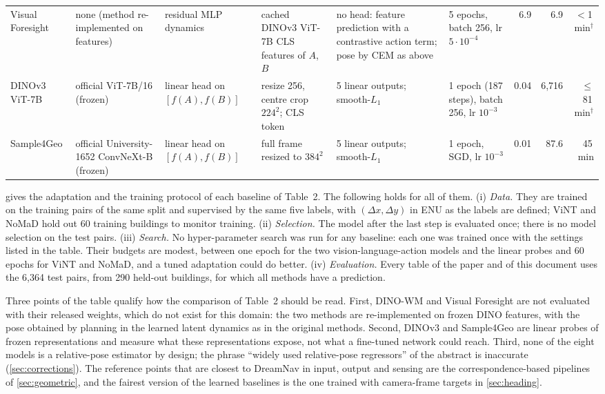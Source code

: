 \documentclass[10pt,twocolumn,letterpaper]{article}
\begin{document}
\begin{table}[t]
{\begin{tabular}{@{}l L{2.3cm} L{2.75cm} L{2.75cm} L{3.3cm} L{2.2cm} r r r@{}}
Visual Foresight & none (method re-implemented on features) & residual MLP dynamics & cached DINOv3 ViT-7B CLS features of $A$, $B$ & no head: feature prediction with a contrastive action term; pose by CEM as above & 5 epochs, batch 256, lr $5{\cdot}10^{-4}$ & 6.9 & 6.9 & $<$1\,min$^\dagger$ \\
DINOv3 ViT-7B & official ViT-7B/16 (frozen) & linear head on $[f(A),f(B)]$ & resize 256, centre crop $224^2$; CLS token & 5 linear outputs; smooth-$L_1$ & 1 epoch (187 steps), batch 256, lr $10^{-3}$ & 0.04 & 6{,}716 & $\le$81\,min$^\dagger$ \\
Sample4Geo & official University-1652 ConvNeXt-B (frozen) & linear head on $[f(A),f(B)]$ & full frame resized to $384^2$ & 5 linear outputs; smooth-$L_1$ & 1 epoch, SGD, lr $10^{-3}$ & 0.01 & 87.6 & 45\,min \\
\bottomrule
\end{tabular}}
\end{table}

 gives the adaptation and the training protocol of each baseline of Table~2. The following holds for all of them. (i) \emph{Data.} They are trained on the training pairs of the same split and supervised by the same five labels, with $(\Delta x,\Delta y)$ in ENU as the labels are defined; ViNT and NoMaD hold out 60 training buildings to monitor training. (ii) \emph{Selection.} The model after the last step is evaluated once; there is no model selection on the test pairs. (iii) \emph{Search.} No hyper-parameter search was run for any baseline: each one was trained once with the settings listed in the table. Their budgets are modest, between one epoch for the two vision-language-action models and the linear probes and 60 epochs for ViNT and NoMaD, and a tuned adaptation could do better. (iv) \emph{Evaluation.} Every table of the paper and of this document uses the 6{,}364 test pairs, from 290 held-out buildings, for which all methods have a prediction.

Three points of the table qualify how the comparison of Table~2 should be read. First, DINO-WM and Visual Foresight are not evaluated with their released weights, which do not exist for this domain: the two methods are re-implemented on frozen DINO features, with the pose obtained by planning in the learned latent dynamics as in the original methods. Second, DINOv3 and Sample4Geo are linear probes of frozen representations and measure what these representations expose, not what a fine-tuned network could reach. Third, none of the eight models is a relative-pose estimator by design; the phrase ``widely used relative-pose regressors'' of the abstract is inaccurate (\cref{sec:corrections}). The reference points that are closest to DreamNav in input, output and sensing are the correspondence-based pipelines of \cref{sec:geometric}, and the fairest version of the learned baselines is the one trained with camera-frame targets in \cref{sec:heading}.
\end{document}
